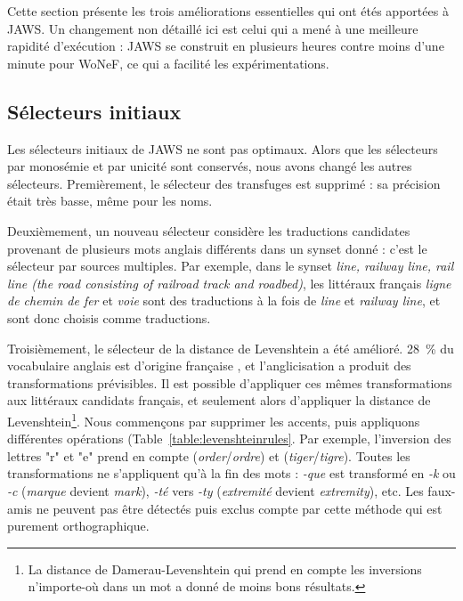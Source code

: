 Cette section présente les trois améliorations essentielles qui ont étés
apportées à JAWS. Un changement non détaillé ici est celui qui a mené à une
meilleure rapidité d'exécution : JAWS se construit en plusieurs heures contre
moins d'une minute pour WoNeF, ce qui a facilité les expérimentations.

\subsection{Sélecteurs initiaux}
\label{subsec:revisiting_extraction_heuristics}


Les sélecteurs initiaux de JAWS ne sont pas optimaux. Alors que les sélecteurs
par monosémie et par unicité sont conservés, nous avons changé les autres
sélecteurs. Premièrement, le sélecteur des transfuges est supprimé : sa
précision était très basse, même pour les noms.

Deuxièmement, un nouveau sélecteur considère les traductions candidates
provenant de plusieurs mots anglais différents dans un synset donné : c'est le
sélecteur par sources multiples. Par exemple, dans le synset \textit{line,
railway line, rail line (the road consisting of railroad track and roadbed)},
les littéraux français \textit{ligne de chemin de fer} et \textit{voie} sont
des traductions à la fois de \textit{line} et \textit{railway line}, et sont
donc choisis comme traductions.

Troisièmement, le sélecteur de la distance de Levenshtein a été amélioré. 28~\%
du vocabulaire anglais est d'origine française \citep{finkenstaedt1973ordered},
et l'anglicisation a produit des transformations prévisibles. Il est possible
d'appliquer ces mêmes transformations aux littéraux candidats français, et
seulement alors d'appliquer la distance de Levenshtein\footnote{La distance de
    Damerau-Levenshtein qui prend en compte les inversions n'importe-où dans un
mot \citep{damerau1964technique} a donné de moins bons résultats.}. Nous
commençons par supprimer les accents, puis appliquons différentes opérations
(Table~\ref{table:levenshteinrules}. Par exemple, l'inversion des lettres "r"
et "e" prend en compte (\textit{order}/\textit{ordre}) et
(\textit{tiger}/\textit{tigre}).  Toutes les transformations ne s'appliquent
qu'à la fin des mots : \textit{-que} est transformé en \textit{-k} ou
\textit{-c} (\textit{marque} devient \textit{mark}), \textit{-té} vers
\textit{-ty} (\textit{extremité} devient \textit{extremity}), etc. Les
faux-amis ne peuvent pas être détectés puis exclus compte par cette méthode qui
est purement orthographique.

